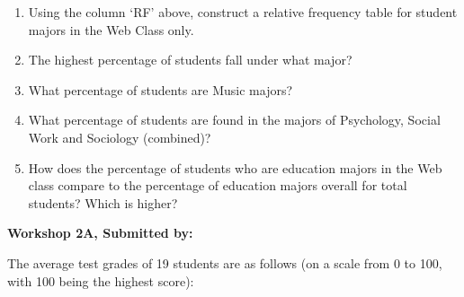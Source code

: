 \documentclass[11pt]{book}\usepackage[]{graphicx}\usepackage[]{color}
\begin{document}
\begin{exercises}
\begin{exercise}
    \end{exercise}
    \begin{solution} %

  \begin{enumerate}
  \item	Using the column `RF' above, construct a relative frequency table for student majors in the Web Class only.
  \item	The highest percentage of students fall under what major?
  \item	What percentage of students are Music majors?
  \item	What percentage of students are found in the majors of Psychology, Social Work and Sociology (combined)?
  \item	How does the percentage of students who are education majors in the Web class compare to the percentage of education majors overall for total students?  Which is higher?
\end{enumerate}

    \end{solution}


\clearpage

    \begin{exercise}  %

    \begin{center}
\begin{flushleft}\textbf{ \large \hfill Workshop 2A, Submitted by: }\end{flushleft}

\end{center}

The average test grades of 19 students are as follows (on a scale from 0 to 100, with 100 being the highest score):


\end{exercise}
\end{exercises}
\end{document}
